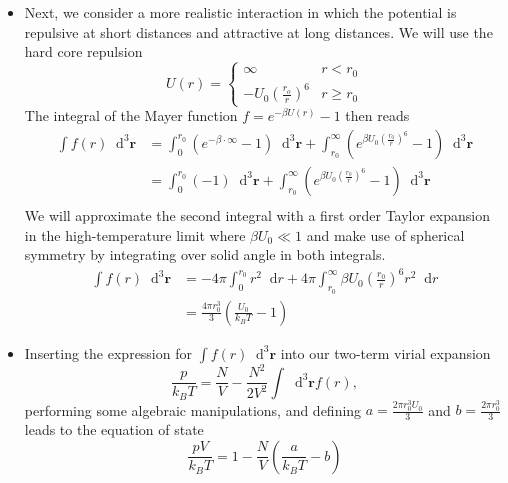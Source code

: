 \documentclass[11pt, a4paper]{article}
\newcommand{\diff}{\mathop{}\!\mathrm{d}} %
\begin{document}
\begin{itemize}
	\item Next, we consider a more realistic interaction in which the potential is repulsive at short distances and attractive at long distances. We will use the hard core repulsion
	\begin{equation*}
		U(r) = 
		\begin{cases}
			\infty & r < r_{0}\\
			-U_{0}\left(\frac{r_{o}}{r}\right)^{6} & r \geq r_{0}
		\end{cases}
	\end{equation*}
	The integral of the Mayer function $ f = e^{-\beta U(r)} - 1$ then reads
	\begin{align*}
		\int f(r)\diff^{3}\bm{r} &= \int_{0}^{r_{0}} \left(e^{-\beta \cdot \infty} - 1\right)\diff^{3}\bm{r} + \int_{r_{0}}^{\infty} \left(e^{\beta U_{0}\left(\frac{r_{0}}{r}\right)^{6}} - 1\right)\diff^{3}\bm{r}\\
		&=\int_{0}^{r_{0}}(-1)\diff^{3}\bm{r} + \int_{r_{0}}^{\infty} \left(e^{\beta U_{0}\left(\frac{r_{0}}{r}\right)^{6}} - 1\right)\diff^{3}\bm{r}\\
	\end{align*}
	We will approximate the second integral with a first order Taylor expansion in the high-temperature limit where $ \beta U_{0} \ll 1$ and make use of spherical symmetry by integrating over solid angle in both integrals.
	\begin{align*}
		\int f(r)\diff^{3}\bm{r} &= - 4\pi \int_{0}^{r_{0}}r^{2}\diff r + 4\pi \int_{r_{0}}^{\infty} \beta U_{0}\left(\frac{r_{0}}{r}\right)^{6} r^{2}\diff r\\
		&=\frac{4\pi r_{0}^{3}}{3}\left(\frac{U_{0}}{k_{B}T}-1\right)
	\end{align*}
	
	\item Inserting the expression for $ \int f(r)\diff^{3}\bm{r} $ into our two-term virial expansion
	\begin{equation*}
		\frac{p}{k_{B}T} = \frac{N}{V} - \frac{N^{2}}{2V^{2}} \int \diff^{3}\bm{r} f(r),
	\end{equation*}
	performing some algebraic manipulations, and defining $ a = \frac{2\pi r_{0}^{3}U_{0}}{3} $ and $ b = \frac{2\pi r_{0}^{3}}{3} $ leads to the equation of state
	\begin{equation*}
		\frac{pV}{k_{B}T} = 1 -\frac{N}{V}\left(\frac{a}{k_{B}T} - b\right)
	\end{equation*}
	

\end{itemize}
\end{document}

